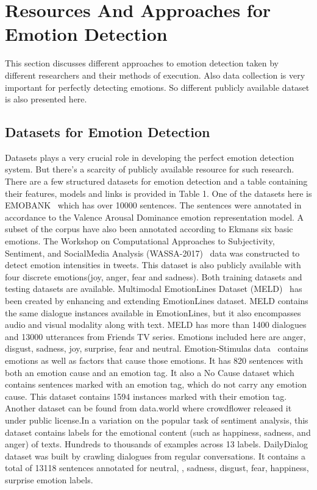 \documentclass[runningheads]{llncs}
\begin{document}
\section{Resources And Approaches for Emotion Detection}
This section discusses different approaches to emotion detection taken by different researchers and their methods of execution. Also data collection is very important for perfectly detecting emotions. So different publicly available dataset is also presented here. 

\subsection{Datasets for Emotion Detection}
Datasets plays a very crucial role in developing the perfect emotion detection system. But there's a scarcity of publicly available resource for such research. There are a few structured datasets for emotion detection and a table containing their features, models and links is provided in Table 1.
One of the datasets here is EMOBANK~\cite{ref15,ref16} which has over 10000 sentences. The sentences were annotated in accordance to the Valence Arousal Dominance emotion representation model. A subset of the corpus have also been annotated according to Ekmans six basic emotions. The Workshop on Computational Approaches to Subjectivity, Sentiment, and SocialMedia Analysis (WASSA-2017)~\cite{ref19} data was constructed to detect emotion intensities in tweets. This dataset is also publicly available with four discrete emotions(joy,  anger, fear and sadness). Both training datasets and testing datasets are available. Multimodal EmotionLines Dataset (MELD)~\cite{ref17,ref18} has been created by enhancing and extending EmotionLines dataset. MELD contains the same dialogue instances available in EmotionLines, but it also encompasses audio and visual modality along with text. MELD has more than 1400 dialogues and 13000 utterances from Friends TV series. Emotions included here are anger, disgust, sadness, joy, surprise, fear and neutral. Emotion-Stimulas data~\cite{ref20} contains emotions as well as factors that cause those emotions. It has 820 sentences with both an emotion cause and an emotion tag. It also a No Cause dataset which contains sentences marked with an emotion tag, which do not carry any emotion cause. This dataset contains 1594 instances marked with their emotion tag. Another dataset can be found from data.world where crowdflower released it under public license.In a variation on the popular task of sentiment analysis, this dataset contains labels for the emotional content (such as happiness, sadness, and anger) of texts. Hundreds to thousands of examples across 13 labels. DailyDialog~\cite{ref21} dataset was built by crawling dialogues from regular conversations. It contains a total of 13118 sentences annotated for neutral, , sadness, disgust, fear, happiness, surprise emotion labels.
\end{document}
